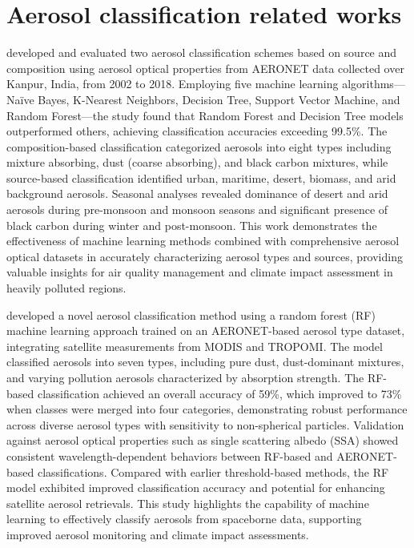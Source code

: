 \documentclass[11pt]{article}
\begin{document}
\section{Aerosol classification related works}
\citet{annapurna2024composition} developed and evaluated two aerosol classification schemes based on source and composition using aerosol optical properties from AERONET data collected over Kanpur, India, from 2002 to 2018. Employing five machine learning algorithms—Naïve Bayes, K-Nearest Neighbors, Decision Tree, Support Vector Machine, and Random Forest—the study found that Random Forest and Decision Tree models outperformed others, achieving classification accuracies exceeding 99.5\%. The composition-based classification categorized aerosols into eight types including mixture absorbing, dust (coarse absorbing), and black carbon mixtures, while source-based classification identified urban, maritime, desert, biomass, and arid background aerosols. Seasonal analyses revealed dominance of desert and arid aerosols during pre-monsoon and monsoon seasons and significant presence of black carbon during winter and post-monsoon. This work demonstrates the effectiveness of machine learning methods combined with comprehensive aerosol optical datasets in accurately characterizing aerosol types and sources, providing valuable insights for air quality management and climate impact assessment in heavily polluted regions.

\citet{choi2021first} developed a novel aerosol classification method using a random forest (RF) machine learning approach trained on an AERONET-based aerosol type dataset, integrating satellite measurements from MODIS and TROPOMI. The model classified aerosols into seven types, including pure dust, dust-dominant mixtures, and varying pollution aerosols characterized by absorption strength. The RF-based classification achieved an overall accuracy of 59\%, which improved to 73\% when classes were merged into four categories, demonstrating robust performance across diverse aerosol types with sensitivity to non-spherical particles. Validation against aerosol optical properties such as single scattering albedo (SSA) showed consistent wavelength-dependent behaviors between RF-based and AERONET-based classifications. Compared with earlier threshold-based methods, the RF model exhibited improved classification accuracy and potential for enhancing satellite aerosol retrievals. This study highlights the capability of machine learning to effectively classify aerosols from spaceborne data, supporting improved aerosol monitoring and climate impact assessments.
\end{document}
